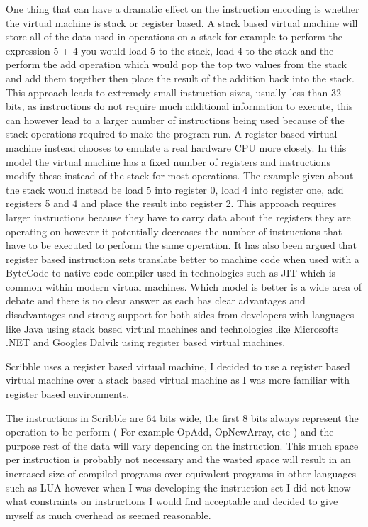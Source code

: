\documentclass[]{final_report}
\begin{document}
One thing that can have a dramatic effect on the instruction encoding is whether the virtual machine is stack or register based. A stack based virtual machine will store all of the  data used in operations on a stack for example to perform the expression 5 + 4 you would load 5 to the stack, load 4 to the stack and the perform the add operation which would pop the top two values from the stack and add them together then place the result of the addition back into the stack. This approach leads to extremely small instruction sizes, usually less than 32 bits, as instructions do not require much additional information to execute, this can however lead to a larger number of instructions being used because of the stack operations required to make the program run. A register based virtual machine instead chooses to emulate a real hardware CPU more closely. In this model the virtual machine has a fixed number of registers and instructions modify these instead of the stack for most operations. The example given about the stack would instead be load 5 into register 0, load 4 into register one, add registers 5 and 4 and place the result into register 2. This approach requires larger instructions because they have to carry data about the registers they are operating on however it potentially decreases the number of instructions that have to be executed to perform the same operation. It has also been argued that register based instruction sets translate better to machine code when used with a ByteCode to native code compiler used in technologies such as JIT which is common within modern virtual machines. Which model is better is a wide area of debate and there is no clear answer as each has clear advantages and disadvantages and strong support for both sides from developers with languages like Java using stack based virtual machines and technologies like Microsofts .NET and Googles Dalvik using register based virtual machines.

Scribble uses a register based virtual machine, I decided to use a register based virtual machine over a stack based virtual machine as I was more familiar with register based environments.

The instructions in Scribble are 64 bits wide, the first 8 bits always represent the operation to be perform ( For example OpAdd, OpNewArray, etc ) and the purpose rest of the data will vary depending on the instruction. This much space per instruction is probably not necessary and the wasted space will result in an increased size of compiled programs over equivalent programs in other languages such as LUA however when I was developing the instruction set I did not know what constraints on instructions I would find acceptable and decided to give myself as much overhead as seemed reasonable.
\end{document}
